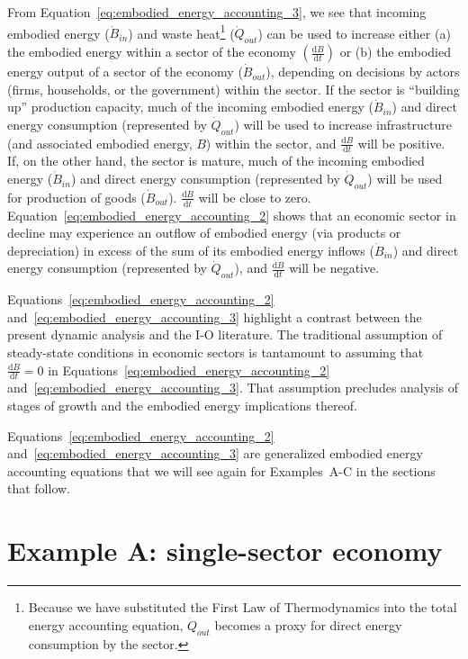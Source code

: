 \noindent From Equation~\ref{eq:embodied_energy_accounting_3},
we see that incoming embodied energy ($\dot{B}_{in}$) and 
waste heat\footnote{Because we have substituted 
the First Law of Thermodynamics into the total energy accounting equation,
$\dot{Q}_{out}$ becomes a proxy for direct energy consumption by the sector.} 
($\dot{Q}_{out}$) can be used to increase either (a)
the embodied energy within a sector of the economy 
$\left( \frac{\mathrm{d}B}{\mathrm{d}t}  \right)$
or (b) the embodied energy output of a sector of the economy 
($\dot{B}_{out}$), 
depending on decisions by actors 
(firms, households, or the government) 
within the sector. 
If the sector is ``building up'' production capacity, 
much of the incoming embodied energy ($\dot{B}_{in}$)
and direct energy consumption (represented by $\dot{Q}_{out}$)
will be used to increase infrastructure 
(and associated embodied energy, $B$) within the sector, 
and $\frac{\mathrm{d}B}{\mathrm{d}t}$ will be positive.
If, on the other hand, the sector is mature, 
much of the incoming embodied energy ($\dot{B}_{in}$)
and direct energy consumption (represented by $\dot{Q}_{out}$)
will be used for production of goods ($\dot{B}_{out}$).
$\frac{\mathrm{d}B}{\mathrm{d}t}$ will be close to zero.
Equation~\ref{eq:embodied_energy_accounting_2} shows that
an economic sector in decline may experience an outflow 
of embodied energy (via products or depreciation)
in excess of the sum of 
its embodied energy inflows ($\dot{B}_{in}$)
and direct energy consumption (represented by $\dot{Q}_{out}$),
and $\frac{\mathrm{d}B}{\mathrm{d}t}$ will be negative.

Equations~\ref{eq:embodied_energy_accounting_2}
and~\ref{eq:embodied_energy_accounting_3} 
highlight a contrast between 
the present dynamic analysis and the I-O literature.
The traditional assumption of steady-state conditions 
in economic sectors is tantamount to assuming that
$\frac{\mathrm{d}B}{\mathrm{d}t} = 0$ in 
Equations~\ref{eq:embodied_energy_accounting_2}
and~\ref{eq:embodied_energy_accounting_3}.
That assumption precludes analysis of stages of growth 
and the embodied energy implications thereof.

Equations~\ref{eq:embodied_energy_accounting_2}
and~\ref{eq:embodied_energy_accounting_3} 
are generalized embodied energy accounting equations that we will
see again for Examples~A-C in the sections that follow.


\section{Example A: single-sector economy} %


